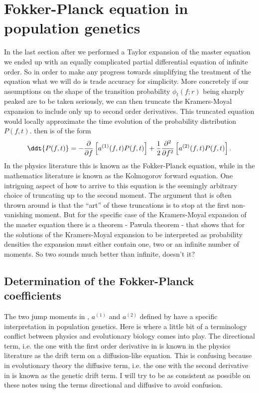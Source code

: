 \section{Fokker-Planck equation in population genetics}

In the last section after we performed a Taylor expansion of the master
equation we ended up with an equally complicated partial differential equation
of infinite order. So in order to make any progress towards simplifying the
treatment of the equation what we will do is trade accuracy for simplicity.
More concretely if our assumptions on the shape of the transition probability
$\phi_t(f; r)$ being sharply peaked are to be taken seriously, we can then
truncate the Kramers-Moyal expansion to include only up to second order
derivatives. This truncated equation would locally approximate the time
evolution of the probability distribution $P(f, t)$. 
then is of the form
\begin{equation}
  \ddt{P(f, t)} = - {\partial \over \partial f}
  \left[
  a^{(1)}(f, t) P(f, t)
  \right] +
  {1 \over 2}{\partial^2 \over \partial f^2}
  \left[
  a^{(2)}(f, t) P(f, t)
  \right].
  \label{eq_fokker_planck}
\end{equation}
In the physics literature this is known as the Fokker-Planck equation, while in
the mathematics literature is known as the Kolmogorov forward equation. One
intriguing aspect of how to arrive to this equation is the seemingly arbitrary
choice of truncating up to the second moment. The argument that is often thrown
around is that the ``art'' of these truncations is to stop at the first
non-vanishing moment. But for the specific case of the Kramers-Moyal expansion
of the master equation there is a theorem - Pawula theorem - that shows that
for the solutions of the Kramers-Moyal expansion to be interpreted as
probability densities the expansion must either contain one, two or an infinite
number of moments. So two sounds much better than infinite, doesn't it?

\subsection{Determination of the Fokker-Planck coefficients}

The two jump moments in , $a^{(1)}$ and $a^{(2)}$
defined by  have a specific interpretation in population
genetics. Here is where a little bit of a terminology conflict between physics
and evolutionary biology comes into play. The directional term, i.e. the one
with the first order derivative in  is known in the
physics literature as the drift term on a diffusion-like equation. This is
confusing because in evolutionary theory the diffusive term, i.e. the one with
the second derivative in  is known as the genetic drift
term. I will try to be as consistent as possible on these notes using the terms
directional and diffusive to avoid confusion.

